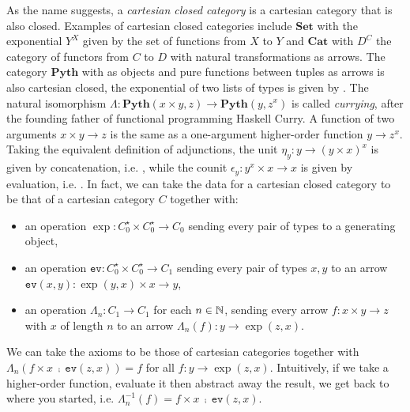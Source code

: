 As the name suggests, a \emph{cartesian closed category} is a cartesian category that is also closed.
Examples of cartesian closed categories include $\mathbf{Set}$ with the exponential $Y^X$ given by the set of functions from $X$ to $Y$ and $\mathbf{Cat}$ with $D^C$ the category of functors from $C$ to $D$ with natural transformations as arrows.
The category $\mathbf{Pyth}$ with  as objects and pure functions between tuples as arrows is also cartesian closed, the exponential of two lists of types  is given by .
The natural isomorphism $\Lambda : \mathbf{Pyth}(x \times y, z) \to \mathbf{Pyth}(y, z^x)$ is called \emph{currying}, after the founding father of functional programming Haskell Curry.
A function of two arguments $x \times y \to z$ is the same as a one-argument higher-order function $y \to z^x$.
Taking the equivalent definition of adjunctions, the unit $\eta_y : y \to (y \times x)^x$ is given by concatenation, i.e. , while the counit $\epsilon_y : y^x \times x \to x$ is given by evaluation, i.e. .
In fact, we can take the data for a cartesian closed category to be that of a cartesian category $C$ together with:
\begin{itemize}
\item an operation $\exp : C_0^\star \times C_0^\star \to C_0$ sending every pair of types to a generating object,
\item an operation $\mathtt{ev} : C_0^\star \times C_0^\star \to C_1$ sending every pair of types $x, y$ to an arrow $\mathtt{ev}(x, y) : \exp(y, x) \times x \to y$,
\item an operation $\Lambda_n : C_1 \to C_1$ for each $n \in \mathbb{N}$, sending every arrow $f : x \times y \to z$ with $x$ of length $n$ to an arrow $\Lambda_n(f) : y \to \exp(z, x)$.
\end{itemize}
We can take the axioms to be those of cartesian categories together with $\Lambda_n(f \times x \ \fcmp \ \mathtt{ev}(z, x)) = f$ for all $f : y \to \exp(z, x)$.
Intuitively, if we take a higher-order function, evaluate it then abstract away the result, we get back to where you started, i.e. $\Lambda_n^{-1}(f) = f \times x \ \fcmp \ \mathtt{ev}(z, x)$.

